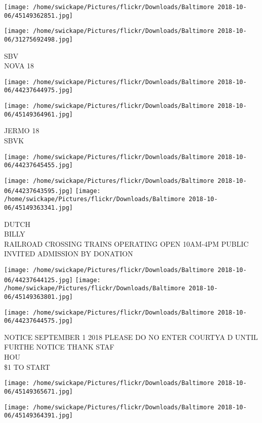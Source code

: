 \documentclass[10pt,letterpaper]{article}
\begin{document}
\texttt{[image: /home/swickape/Pictures/flickr/Downloads/Baltimore 2018-10-06/45149362851.jpg]}

\vspace{0.25in}
\texttt{[image: /home/swickape/Pictures/flickr/Downloads/Baltimore 2018-10-06/31275692498.jpg]}

SBV\\
NOVA 18
\pagebreak

\texttt{[image: /home/swickape/Pictures/flickr/Downloads/Baltimore 2018-10-06/44237644975.jpg]}

\vspace{0.25in}
\texttt{[image: /home/swickape/Pictures/flickr/Downloads/Baltimore 2018-10-06/45149364961.jpg]}

JERMO 18\\
SBVK
\pagebreak

\texttt{[image: /home/swickape/Pictures/flickr/Downloads/Baltimore 2018-10-06/44237645455.jpg]}

\vspace{0.25in}
\texttt{[image: /home/swickape/Pictures/flickr/Downloads/Baltimore 2018-10-06/44237643595.jpg]}
\texttt{[image: /home/swickape/Pictures/flickr/Downloads/Baltimore 2018-10-06/45149363341.jpg]}

DUTCH\\
BILLY\\
RAILROAD CROSSING TRAINS OPERATING OPEN 10AM{-}4PM PUBLIC INVITED ADMISSION BY DONATION
\pagebreak

\texttt{[image: /home/swickape/Pictures/flickr/Downloads/Baltimore 2018-10-06/44237644125.jpg]}
\texttt{[image: /home/swickape/Pictures/flickr/Downloads/Baltimore 2018-10-06/45149363801.jpg]}

\texttt{[image: /home/swickape/Pictures/flickr/Downloads/Baltimore 2018-10-06/44237644575.jpg]}

NOTICE SEPTEMBER 1 2018 PLEASE DO NO ENTER COURTYA D UNTIL FURTHE NOTICE THANK STAF\\
HOU\\
\$1 TO START
\pagebreak

\texttt{[image: /home/swickape/Pictures/flickr/Downloads/Baltimore 2018-10-06/45149365671.jpg]}

\vspace{0.25in}
\texttt{[image: /home/swickape/Pictures/flickr/Downloads/Baltimore 2018-10-06/45149364391.jpg]}
\end{document}
